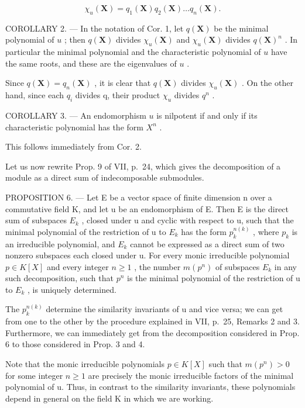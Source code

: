 \[
\chi_ {u} (\mathbf {X}) = q _ {1} (\mathbf {X}) q _ {2} (\mathbf {X}) \dots q _ {n} (\mathbf {X}).
\]

COROLLARY 2. --- In the notation of Cor. 1, let \(q(\mathbf{X})\) be the minimal polynomial of \(u\) ; then \(q(\mathbf{X})\) divides \(\chi_u(\mathbf{X})\) and \(\chi_u(\mathbf{X})\) divides \(q(\mathbf{X})^n\) . In particular the minimal polynomial and the characteristic polynomial of \(u\) have the same roots, and these are the eigenvalues of \(u\) .

Since \(q(\mathbf{X}) = q_{n}(\mathbf{X})\) , it is clear that \(q(\mathbf{X})\) divides \(\chi_{u}(\mathbf{X})\) . On the other hand, since each \(q_{i}\) divides q, their product \(\chi_{u}\) divides \(q^{n}\) .

COROLLARY 3. --- An endomorphism \(u\) is nilpotent if and only if its characteristic polynomial has the form \(X^n\) .

This follows immediately from Cor. 2.

Let us now rewrite Prop. 9 of VII, p.~24, which gives the decomposition of a module as a direct sum of indecomposable submodules.

PROPOSITION 6. --- Let E be a vector space of finite dimension n over a commutative field K, and let u be an endomorphism of E. Then E is the direct sum of subspaces \(E_{k}\) , closed under u and cyclic with respect to u, such that the minimal polynomial of the restriction of u to \(E_{k}\) has the form \(p_{k}^{n(k)}\) , where \(p_{k}\) is an irreducible polynomial, and \(E_{k}\) cannot be expressed as a direct sum of two nonzero subspaces each closed under u. For every monic irreducible polynomial \(p \in K[X]\) and every integer \(n \geqslant 1\) , the number \(m(p^{n})\) of subspaces \(E_{k}\) in any such decomposition, such that \(p^{n}\) is the minimal polynomial of the restriction of u to \(E_{k}\) , is uniquely determined.

The \(p_{k}^{n(k)}\) determine the similarity invariants of u and vice versa; we can get from one to the other by the procedure explained in VII, p.~25, Remarks 2 and 3. Furthermore, we can immediately get from the decomposition considered in Prop. 6 to those considered in Prop. 3 and 4.

Note that the monic irreducible polynomials \(p \in K[X]\) such that \(m(p^{n}) > 0\) for some integer \(n \geqslant 1\) are precisely the monic irreducible factors of the minimal polynomial of u. Thus, in contrast to the similarity invariants, these polynomials depend in general on the field K in which we are working.

